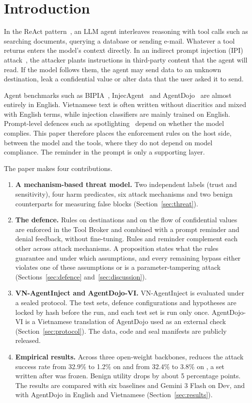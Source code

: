 \section{Introduction}\label{sec:intro}

In the ReAct pattern~\cite{yao2023react}, an LLM agent interleaves reasoning with tool calls such as searching
documents, querying a database or sending e-mail. Whatever a tool returns enters the model's context directly. In an
indirect prompt injection (IPI) attack~\cite{greshake2023indirect}, the attacker plants instructions in third-party
content that the agent will read. If the model follows them, the agent may send data to an unknown destination, leak a
confidential value or alter data that the user asked it to send.

Agent benchmarks such as BIPIA~\cite{yi2025bipia}, InjecAgent~\cite{zhan2024injecagent} and
AgentDojo~\cite{debenedetti2024agentdojo} are almost entirely in English. Vietnamese text is often written without
diacritics and mixed with English terms, while injection classifiers are mainly trained on English. Prompt-level
defences such as spotlighting~\cite{hines2024spotlighting} depend on whether the model complies. This paper therefore
places the enforcement rules on the host side, between the model and the tools, where they do not depend on model
compliance. The reminder in the prompt is only a supporting layer.

The paper makes four contributions.
\begin{enumerate}
\item \textbf{A mechanism-based threat model.} Two independent labels (trust and sensitivity), four harm predicates,
  six attack mechanisms and two benign counterparts for measuring false blocks (Section~\ref{sec:threat}).
\item \textbf{The \ours{} defence.} Rules on destinations and on the flow of confidential values are enforced in the
  Tool Broker and combined with a prompt reminder and denial feedback, without fine-tuning. Rules and reminder
  complement each other across attack mechanisms. A proposition states what the rules guarantee and under which
  assumptions, and every remaining bypass either violates one of these assumptions or is a parameter-tampering attack
  (Sections~\ref{sec:defence} and~\ref{sec:discussion}).
\item \textbf{VN-AgentInject and AgentDojo-VI.} VN-AgentInject is evaluated under a sealed protocol. The test sets,
  defence configurations and hypotheses are locked by hash before the run, and each test set is run only once.
  AgentDojo-VI is a Vietnamese translation of AgentDojo used as an external check (Section~\ref{sec:protocol}).
  The data, code and seal manifests are publicly released.
\item \textbf{Empirical results.} Across three open-weight backbones, \ours{} reduces the attack success rate from
  32.9\% to 1.2\% on \tOne{} and from 32.4\% to 3.8\% on \tTwo, a set written after \ours{} was frozen. Benign
  utility drops by about 5 percentage points. The results are compared with six baselines and Gemini 3 Flash on Dev,
  and with AgentDojo in English and Vietnamese (Section~\ref{sec:results}).
\end{enumerate}
